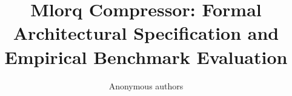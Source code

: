 \title{\textbf{Mlorq Compressor: Formal Architectural Specification and Empirical Benchmark Evaluation}}

\author{Anonymous authors}
